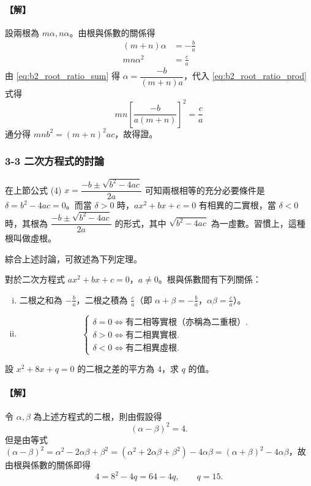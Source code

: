 \paragraph{【解】}
設兩根為 $m\alpha, n\alpha$。由根與係數的關係得
\begin{align}
(m+n)\alpha &= -\frac{b}{a} \tag{1}\label{eq:b2_root_ratio_sum} \\
mn\alpha^2 &= \frac{c}{a} \tag{2}\label{eq:b2_root_ratio_prod}
\end{align}
由 \eqref{eq:b2_root_ratio_sum} 得 $\alpha = \dfrac{-b}{(m+n)a}$，代入 \eqref{eq:b2_root_ratio_prod} 式得
\[
mn\left[\frac{-b}{a(m+n)}\right]^2 = \frac{c}{a}
\]
通分得 $mnb^2 = (m+n)^2 ac$，故得證。


\subsubsection*{3-3 二次方程式的討論}

在上節公式 (4) $x = \dfrac{-b \pm \sqrt{b^2-4ac}}{2a}$ 可知兩根相等的充分必要條件是 $\delta = b^2-4ac = 0$。而當 $\delta > 0$ 時，$ax^2+bx+c=0$ 有相異的二實根，當 $\delta < 0$ 時，其根為 $\dfrac{-b \pm \sqrt{b^2-4ac}}{2a}$ 的形式，其中 $\sqrt{b^2-4ac}$ 為一虛數。習慣上，這種根叫做虛根。

綜合上述討論，可敘述為下列定理。

\begin{theorem}\label{thm:b2_1-2}
對於二次方程式 $ax^2+bx+c=0$，$a \ne 0$。根與係數間有下列關係：
\begin{enumerate}[(i)]
  \item 二根之和為 $-\frac{b}{a}$，二根之積為 $\frac{c}{a}$（即 $\alpha+\beta = -\frac{b}{a}$，$\alpha\beta = \frac{c}{a}$）。
  \item
  \[
  \begin{cases}
  \delta = 0 \iff \text{有二相等實根（亦稱為二重根）}. \\
  \delta > 0 \iff \text{有二相異實根}. \\
  \delta < 0 \iff \text{有二相異虛根}.
  \end{cases}
  \]
\end{enumerate}
\end{theorem}

\begin{example}\label{ex:b2_1-3-4}
設 $x^2+8x+q=0$ 的二根之差的平方為 $4$，求 $q$ 的值。
\end{example}
\paragraph{【解】}
令 $\alpha, \beta$ 為上述方程式的二根，則由假設得
\[
(\alpha-\beta)^2 = 4.
\]
但是由等式 $(\alpha-\beta)^2 = \alpha^2-2\alpha\beta+\beta^2 = (\alpha^2+2\alpha\beta+\beta^2)-4\alpha\beta = (\alpha+\beta)^2-4\alpha\beta$，故由根與係數的關係即得
\[
4 = 8^2-4q = 64-4q,\qquad q=15.
\]



